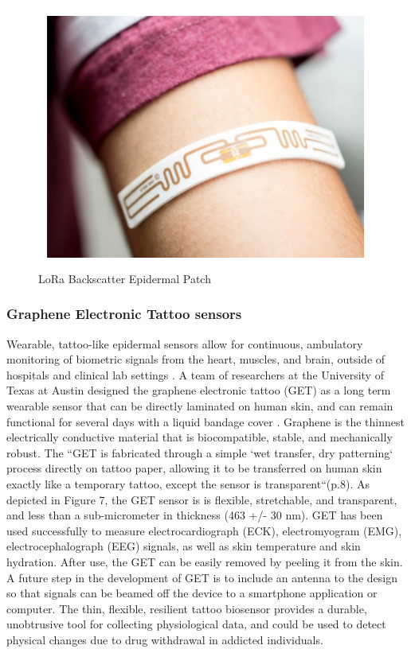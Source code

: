\documentclass[sigconf]{acmart}
\begin{document}
\begin{figure}[!ht]
  \centering\includegraphics[width=\columnwidth]{images/Figure6.pdf}
  \caption{LoRa Backscatter Epidermal Patch \cite{talla17}
  }\label{f:Figure6}
\end{figure}

\subsubsection{Graphene Electronic Tattoo sensors}

Wearable, tattoo-like epidermal sensors allow for continuous, ambulatory 
monitoring of biometric signals from the heart, muscles, and brain, outside of
hospitals and clinical lab settings \cite{bourzac17}. A team of researchers at 
the University of Texas at Austin designed the graphene electronic tattoo (GET)
as a long term wearable sensor that can be directly laminated on human skin, 
and can remain functional for several days with a liquid bandage cover 
\cite{ameri17}. Graphene is the thinnest electrically conductive material
that is biocompatible, stable, and mechanically robust. The ``GET is 
fabricated through a simple `wet transfer, dry patterning` process directly
on tattoo paper, allowing it to be transferred  on human skin exactly like 
a temporary tattoo, except the sensor is transparent``(p.8)\cite{ameri17}. 
As depicted in Figure 7, the GET sensor is is flexible, stretchable, and 
transparent, and less than a sub-micrometer in thickness (463 +/- 30 nm). 
GET has been used successfully to measure electrocardiograph (ECK), 
electromyogram (EMG), electrocephalograph (EEG) signals, as well as skin 
temperature and skin hydration. After use, the GET can be easily removed by 
peeling it from the skin. A future step in the development of GET is to include
an antenna to the design so that signals can be beamed off the device to a
smartphone application or computer. The thin, flexible, resilient tattoo 
biosensor provides a durable, unobtrusive tool for collecting physiological 
data, and could be used to detect physical changes due to drug withdrawal 
in addicted individuals. 
\end{document}
